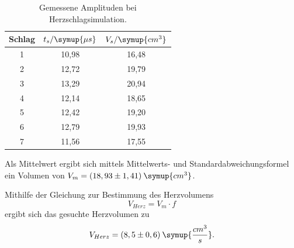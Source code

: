 \begin{table}[H]
  \centering
  \caption{Gemessene Amplituden bei Herzschlagsimulation.}
  \label{tab:1}
  \begin{tabular}{c c c }
    \toprule
  Schlag & $t_s/\symup{\mu s}$ & $V_s/\symup{cm^3}$ \\
    \midrule
    1  &  10,98 & 16,48     \\
    2  &  12,72 & 19,79     \\
    3  &  13,29 & 20,94     \\
    4  &  12,14 & 18,65     \\
    5  &  12,42 & 19,20     \\
    6  &  12,79 & 19,93     \\
    7  &  11,56 & 17,55     \\
    \bottomrule
  \end{tabular}
\end{table}

\noindent Als Mittelwert ergibt sich mittels Mittelwerts- und Standardabweichungsformel
 ein Volumen von $V_{m} = (18,93 \pm 1,41) \: \symup{cm^3}$.

\noindent Mithilfe der Gleichung zur Bestimmung des Herzvolumens\cite[S.5]{kent}
\begin{equation*}
  V_{Herz} = V_m \cdot f
\end{equation*}
ergibt sich das gesuchte Herzvolumen zu
\begin{equation*}
  V_{Herz} = (8,5 \pm 0,6) \: \symup{\frac{cm^3}{s}}.
\end{equation*}

